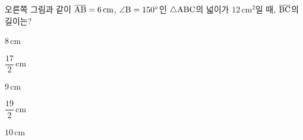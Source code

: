 \noindent\begin{minipage}[t]{0.58\linewidth}\vspace{0pt}\raggedright 오른쪽 그림과 같이 $\overline{\mathrm{AB}}=6\,\mathrm{cm}$, $\angle\mathrm{B}=150^\circ$인 $\triangle\mathrm{ABC}$의 넓이가 $12\,\mathrm{cm}^2$일 때, $\overline{\mathrm{BC}}$의 길이는?\end{minipage}\hfill\begin{minipage}[t]{0.4\linewidth}\vspace{0pt}\centering \resizebox{\ifdim\width>\linewidth\linewidth\else\width\fi}{!}{}\end{minipage}\par
\begin{choices32}{\rule[-3ex]{0pt}{8ex}$8\,\mathrm{cm}$}{\rule[-3ex]{0pt}{8ex}$\dfrac{17}{2}\,\mathrm{cm}$}{\rule[-3ex]{0pt}{8ex}$9\,\mathrm{cm}$}{\rule[-3ex]{0pt}{8ex}$\dfrac{19}{2}\,\mathrm{cm}$}{\rule[-3ex]{0pt}{8ex}$10\,\mathrm{cm}$}\end{choices32}
